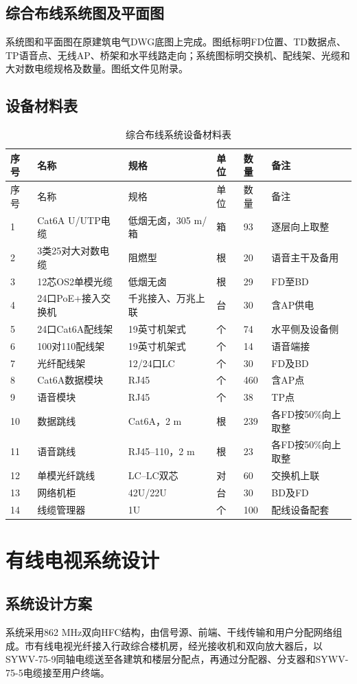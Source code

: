 \documentclass[UTF8,zihao=-4,openany]{ctexrep}
\begin{document}
\section{综合布线系统图及平面图}
系统图和平面图在原建筑电气DWG底图上完成。图纸标明FD位置、TD数据点、TP语音点、无线AP、桥架和水平线路走向；系统图标明交换机、配线架、光缆和大对数电缆规格及数量。图纸文件见附录。

\section{设备材料表}
\small
\begin{longtable}{p{0.6cm}p{3.3cm}p{3.3cm}p{0.6cm}p{0.7cm}p{3.2cm}}
\caption{综合布线系统设备材料表}\\
\toprule
序号&名称&规格&单位&数量&备注\\
\midrule
\endfirsthead
\toprule
序号&名称&规格&单位&数量&备注\\
\midrule
\endhead
1&Cat6A U/UTP电缆&低烟无卤，305 m/箱&箱&93&逐层向上取整\\
2&3类25对大对数电缆&阻燃型&根&20&语音主干及备用\\
3&12芯OS2单模光缆&低烟无卤&根&29&FD至BD\\
4&24口PoE+接入交换机&千兆接入、万兆上联&台&30&含AP供电\\
5&24口Cat6A配线架&19英寸机架式&个&74&水平侧及设备侧\\
6&100对110配线架&19英寸机架式&个&14&语音端接\\
7&光纤配线架&12/24口LC&个&30&FD及BD\\
8&Cat6A数据模块&RJ45&个&460&含AP点\\
9&语音模块&RJ45&个&38&TP点\\
10&数据跳线&Cat6A，2 m&根&239&各FD按50\%向上取整\\
11&语音跳线&RJ45--110，2 m&根&23&各FD按50\%向上取整\\
12&单模光纤跳线&LC--LC双芯&对&60&交换机上联\\
13&网络机柜&42U/22U&台&30&BD及FD\\
14&线缆管理器&1U&个&100&配线设备配套\\
\bottomrule
\end{longtable}
\normalsize

\chapter{有线电视系统设计}
\section{系统设计方案}
系统采用862 MHz双向HFC结构，由信号源、前端、干线传输和用户分配网络组成。市有线电视光纤接入行政综合楼机房，经光接收机和双向放大器后，以SYWV-75-9同轴电缆送至各建筑和楼层分配点，再通过分配器、分支器和SYWV-75-5电缆接至用户终端。
\end{document}
